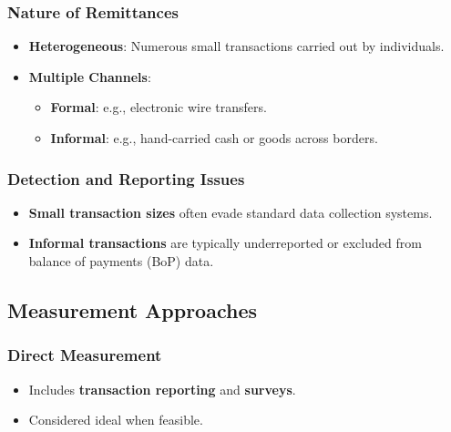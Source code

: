 \documentclass[
  11pt,
]{article}
\providecommand{\tightlist}{%
  \setlength{\itemsep}{0pt}\setlength{\parskip}{0pt}}
\begin{document}
\subsubsection{Nature of Remittances}\label{nature-of-remittances}

\begin{itemize}
\tightlist
\item
  \textbf{Heterogeneous}: Numerous small transactions carried out by
  individuals.
\item
  \textbf{Multiple Channels}:

  \begin{itemize}
  \tightlist
  \item
    \textbf{Formal}: e.g., electronic wire transfers.
  \item
    \textbf{Informal}: e.g., hand-carried cash or goods across borders.
  \end{itemize}
\end{itemize}

\subsubsection{Detection and Reporting
Issues}\label{detection-and-reporting-issues}

\begin{itemize}
\tightlist
\item
  \textbf{Small transaction sizes} often evade standard data collection
  systems.
\item
  \textbf{Informal transactions} are typically underreported or excluded
  from balance of payments (BoP) data.
\end{itemize}

\subsection{Measurement Approaches}\label{measurement-approaches}

\subsubsection{Direct Measurement}\label{direct-measurement}

\begin{itemize}
\tightlist
\item
  Includes \textbf{transaction reporting} and \textbf{surveys}.
\item
  Considered ideal when feasible.
\end{itemize}
\end{document}
